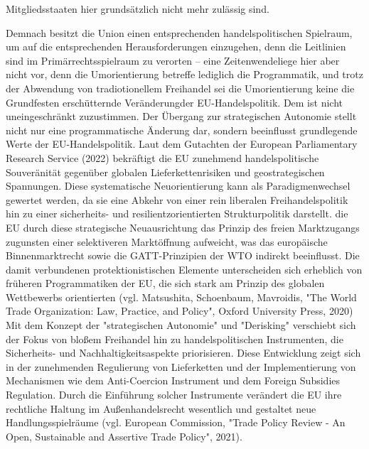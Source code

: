 \documentclass[12pt,a4paper,oneside]{book} %
\begin{document}
Mitgliedsstaaten hier grundsätzlich nicht mehr zulässig sind.\autocite{Callies/Ruffert, Art. 207 AEUV Rn. 76}
		
Demnach besitzt die Union einen entsprechenden handelspolitischen Spielraum, um auf die entsprechenden Herausforderungen einzugehen, denn die Leitlinien sind im Primärrechtsspielraum zu verorten\autocite{Paschke, RdTW 2024, 206, 216} -- eine \glqq Zeitenwende\grqq liege hier aber nicht vor, denn die Umorientierung betreffe lediglich die Programmatik, und trotz der Abwendung von tradiotionellem Freihandel sei die Umorientierung \glqq keine die Grundfesten erschütternde Veränderung\grqq der EU-Handelspolitik.\autocite[So argumentieren]{Paschke, RdTW 2024, 206, 216; Müller-Ibold/Herrmann EuZW 2022, 1029} Dem ist nicht uneingeschränkt zuzustimmen.  Der Übergang zur strategischen Autonomie stellt nicht nur eine programmatische Änderung dar, sondern beeinflusst grundlegende Werte der EU-Handelspolitik. Laut dem Gutachten der European Parliamentary Research Service (2022) bekräftigt die EU zunehmend handelspolitische Souveränität gegenüber globalen Lieferkettenrisiken und geostrategischen Spannungen. Diese systematische Neuorientierung kann als Paradigmenwechsel gewertet werden, da sie eine Abkehr von einer rein liberalen Freihandelspolitik hin zu einer sicherheits- und resilientzorientierten Strukturpolitik darstellt. die EU durch diese strategische Neuausrichtung das Prinzip des freien Marktzugangs zugunsten einer selektiveren Marktöffnung aufweicht, was das europäische Binnenmarktrecht sowie die GATT-Prinzipien der WTO indirekt beeinflusst. Die damit verbundenen protektionistischen Elemente unterscheiden sich erheblich von früheren Programmatiken der EU, die sich stark am Prinzip des globalen Wettbewerbs orientierten (vgl. Matsushita, Schoenbaum, Mavroidis, "The World Trade Organization: Law, Practice, and Policy", Oxford University Press, 2020) Mit dem Konzept der "strategischen Autonomie" und "Derisking" verschiebt sich der Fokus von bloßem Freihandel hin zu handelspolitischen Instrumenten, die Sicherheits- und Nachhaltigkeitsaspekte priorisieren. Diese Entwicklung zeigt sich in der zunehmenden Regulierung von Lieferketten und der Implementierung von Mechanismen wie dem Anti-Coercion Instrument und dem Foreign Subsidies Regulation. Durch die Einführung solcher Instrumente verändert die EU ihre rechtliche Haltung im Außenhandelsrecht wesentlich und gestaltet neue Handlungsspielräume (vgl. European Commission, "Trade Policy Review - An Open, Sustainable and Assertive Trade Policy", 2021).
	
\end{document}
